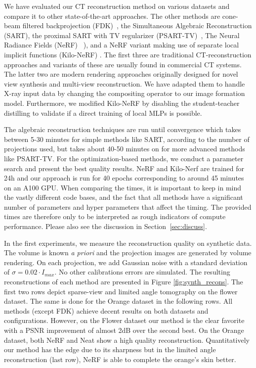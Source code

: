 \documentclass[acmtog,nonacm]{acmart} \acmSubmissionID{0438}
\begin{document}
We have evaluated our CT reconstruction method on various datasets and
compare it to other state-of-the-art approaches.  The other methods
are cone-beam filtered backprojection (FDK)~\cite{feldkamp1984practical}, 
the Simultaneous Algebraic Reconstruction
(SART)\cite{kak2001principles}, the proximal SART with TV regularizer
(PSART-TV)~\cite{zang2018super}, The Neural Radiance Fields (NeRF)
~\cite{mildenhall2020nerf}), and a NeRF variant making use of separate
local implicit functions (Kilo-NeRF) \cite{reiser2021kilonerf}.  The
first three are traditional CT-reconstruction approaches and variants
of these are usually found in commercial CT systems.  The latter two
are modern rendering approaches originally designed for novel view
synthesis and multi-view reconstruction. We have adapted them to
handle X-ray input data by changing the compositing operator to our
image formation model.  Furthermore, we modified Kilo-NeRF by
disabling the student-teacher distilling to validate if a direct
training of local MLPs is possible.

The algebraic reconstruction techniques are run until convergence
which takes between 5-30 minutes for simple methods like SART, according to the number of projections used, but
takes about 40-50 minutes on for more advanced methods like
PSART-TV. For the optimization-based methods, we conduct a parameter
search and present the best quality results.
NeRF and Kilo-Nerf
are trained for 24h and our approach is run for 40 epochs
corresponding to around 45 minutes on an A100 GPU.  When comparing the
times, it is important to keep in mind the vastly different code
bases, and the fact that all methods have a significant number of
parameters and hyper parameters that affect the timing. The provided
times are therefore only to be interpreted as rough indicators of
compute performance. Please also see the discussion in
Section~\ref{sec:discuss}.

In the first experiments, we measure the reconstruction quality on synthetic data.
The volume is known \textit{a priori} and the projection images are generated by volume rendering.
On each projection, we add Gaussian noise with a standard deviation of $\sigma = 0.02 \cdot I_{max}$.
No other calibrations errors are simulated.
The resulting reconstructions of each method are presented in Figure \ref{fig:synth_recons}.
The first two rows depict sparse-view and limited angle tomography on the flower dataset.
The same is done for the Orange dataset in the following rows.
All methods (except FDK) achieve decent results on both datasets and configurations.
However, on the Flower dataset our method is the clear favorite with a PSNR improvement of almost 2dB over the second best.
On the Orange dataset, both NeRF and Neat show a high quality reconstruction.
Quantitatively our method has the edge due to its sharpness but in the limited angle reconstruction (last row), NeRF is able to complete the orange's skin better.
\end{document}
